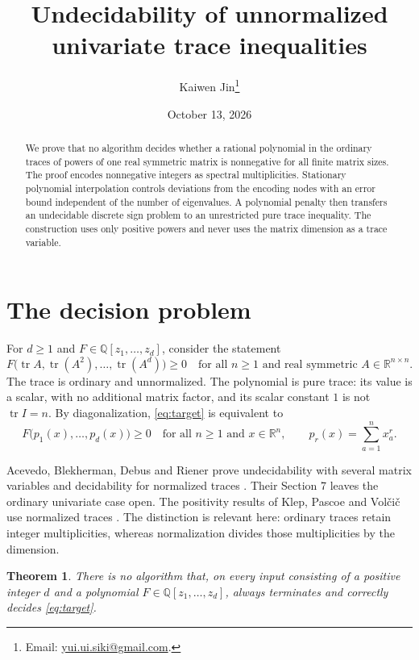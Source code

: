 \documentclass[11pt]{article}
\title{Undecidability of unnormalized univariate trace inequalities}
\author{Kaiwen Jin\thanks{Email: \href{mailto:yui.ui.siki@gmail.com}{yui.ui.siki@gmail.com}.}}
\date{October 13, 2026}
\newtheorem{theorem}{Theorem}
\newcommand{\tr}{\operatorname{tr}}
\begin{document}
\maketitle
\begin{abstract}
We prove that no algorithm decides whether a rational polynomial in the
ordinary traces of powers of one real symmetric matrix is nonnegative for
all finite matrix sizes. The proof encodes nonnegative integers as spectral
multiplicities. Stationary polynomial interpolation controls deviations from
the encoding nodes with an error bound independent of the number of
eigenvalues. A polynomial penalty then transfers an undecidable discrete
sign problem to an unrestricted pure trace inequality. The construction uses
only positive powers and never uses the matrix dimension as a trace variable.
\end{abstract}

\section{The decision problem}

For $d\geq1$ and $F\in\mathbb{Q}[z_1,\ldots,z_d]$, consider the statement
\begin{equation}\label{eq:target}
 F\bigl(\tr A,\tr(A^2),\ldots,\tr(A^d)\bigr)\geq0
 \quad\text{for all }n\geq1\text{ and real symmetric }A\in\mathbb{R}^{n\times n}.
\end{equation}
The trace is ordinary and unnormalized. The polynomial is pure trace: its
value is a scalar, with no additional matrix factor, and its scalar constant
$1$ is not $\tr I=n$. By diagonalization, \eqref{eq:target} is equivalent to
\begin{equation}\label{eq:spectrum}
 F\bigl(p_1(x),\ldots,p_d(x)\bigr)\geq0
 \quad\text{for all }n\geq1\text{ and }x\in\mathbb{R}^n,
 \qquad p_r(x)=\sum_{a=1}^n x_a^r.
\end{equation}

Acevedo, Blekherman, Debus and Riener prove undecidability with several
matrix variables and decidability for normalized traces
\cite[Theorems 6.2 and 6.5]{ABDR}. Their Section 7 leaves the ordinary
univariate case open. The positivity results of Klep, Pascoe and Vol\v{c}i\v{c}
use normalized traces \cite[Introduction, arXiv version v2]{KPV}. The distinction is relevant here:
ordinary traces retain integer multiplicities, whereas normalization divides
those multiplicities by the dimension.

\begin{theorem}\label{thm:main}
There is no algorithm that, on every input consisting of a positive integer
$d$ and a polynomial $F\in\mathbb{Q}[z_1,\ldots,z_d]$, always terminates and
correctly decides \eqref{eq:target}.
\end{theorem}
\end{document}
